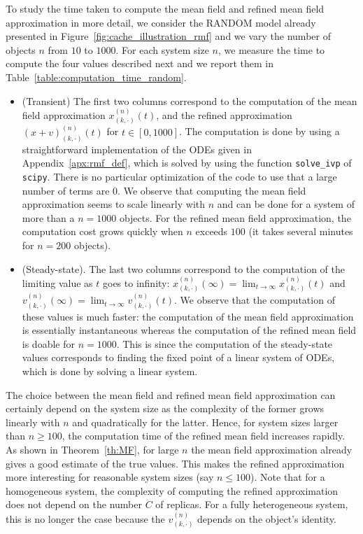\documentclass[acmsmall]{acmart}
\newcommand\toN{^{(n)}}
\begin{document}
To study the time taken to compute the mean field and refined mean field approximation in more detail, we consider the RANDOM model already presented in Figure~\ref{fig:cache_illustration_rmf} and we vary the number of objects $n$ from $10$ to $1000$. For each system size $n$, we measure the time to compute the four values described next and we report them in Table~\ref{table:computation_time_random}. 
\begin{itemize}[wide, labelwidth=!, labelindent=0pt]
  \item (Transient) The first two columns correspond to the computation of the mean field approximation $x\toN_{(k,\cdot)}(t)$, and the refined approximation $(x+v)\toN_{(k,\cdot)}(t)$ for $t\in[0,1000]$. The computation is done by using a straightforward implementation of the ODEs given in Appendix~\ref{apx:rmf_def}, which is solved by using the function \texttt{solve\_ivp} of \texttt{scipy}. There is no particular optimization of the code to use that a large number of terms are $0$. We observe that computing the mean field approximation seems to scale linearly with $n$ and can be done for a system of more than a $n=1000$ objects. For the refined mean field approximation, the computation cost grows quickly when $n$ exceeds $100$ (it takes several minutes for $n=200$ objects).
  \item (Steady-state). The last two columns correspond to the computation of the limiting value as $t$ goes to infinity: $x\toN_{(k,\cdot)}(\infty) = \lim_{t\to\infty}x\toN_{(k,\cdot)}(t)$ and $v\toN_{(k,\cdot)}(\infty) = \lim_{t\to\infty}v\toN_{(k,\cdot)}(t)$. We observe that the computation of these values is much faster: the computation of the mean field approximation is essentially instantaneous whereas the computation of the refined mean field is doable for $n=1000$. This is since the computation of the steady-state values corresponds to finding the fixed point of a linear system of ODEs, which is done by solving a linear system.
\end{itemize}

The choice between the mean field and refined mean field approximation can certainly depend on the system size as the complexity of the former grows linearly with $n$ and quadratically for the latter. Hence, for system sizes larger than $n\ge 100$, the computation time of the refined mean field increases rapidly. As shown in Theorem~\ref{th:MF}, for large $n$ the mean field approximation already gives a good estimate of the true values. This makes the refined approximation more interesting for reasonable system sizes (say $n\le100$). Note that for a homogeneous system, the complexity of computing the refined approximation does not depend on the number $C$ of replicas. For a fully heterogeneous system, this is no longer the case because the $v\toN_{(k,\cdot)}$ depends on the object's identity. 
\end{document}
